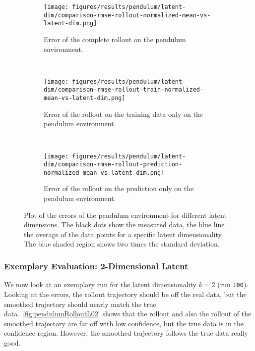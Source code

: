 			\begin{figure}
				\centering
				\begin{subfigure}{0.7\linewidth}
					\centering
					\texttt{[image: figures/results/pendulum/latent-dim/comparison-rmse-rollout-normalized-mean-vs-latent-dim.png]}
					\caption[Error of the complete rollout on the pendulum environment]{Error of the complete rollout on the pendulum environment.}
					\label{fig:pendulumRmseComplete}
				\end{subfigure} \\
				\begin{subfigure}{0.5\linewidth}
					\centering
					\texttt{[image: figures/results/pendulum/latent-dim/comparison-rmse-rollout-train-normalized-mean-vs-latent-dim.png]}
					\caption[Error of the training rollout on the pendulum environment]{Error of the rollout on the training data only on the pendulum environment.}
					\label{fig:pendulumRmseTrain}
				\end{subfigure}%
				~
				\begin{subfigure}{0.5\linewidth}
					\centering
					\texttt{[image: figures/results/pendulum/latent-dim/comparison-rmse-rollout-prediction-normalized-mean-vs-latent-dim.png]}
					\caption[Error of the prediction rollout on the pendulum environment]{Error of the rollout on the prediction only on the pendulum environment.}
					\label{fig:pendulumRmsePred}
				\end{subfigure}
				\caption[Errors on the pendulum environment for different latent dimensions]{Plot of the errors of the pendulum environment for different latent dimensions. The black dots show the measured data, the blue line the average of the data points for a specific latent dimensionality. The blue shaded region shows two times the standard deviation.}
				\label{fig:pendulumRmse}
			\end{figure}

		\subsubsection{Exemplary Evaluation: 2-Dimensional Latent}
			We now look at an exemplary run for the latent dimensionality \( k = 2 \) (run \texttt{100}). Looking at the errors, the rollout trajectory should be off the real data, but the smoothed trajectory should nearly match the true data.~\autoref{fig:pendulumRolloutL02} shows that the rollout and also the rollout of the smoothed trajectory are far off with low confidence, but the true data is in the confidence region. However, the smoothed trajectory follows the true data really good.

